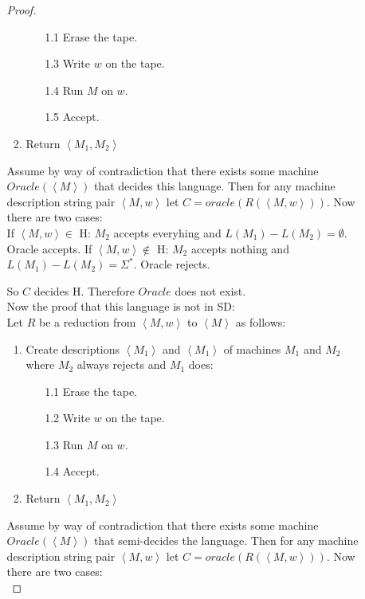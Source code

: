 \documentclass[10pt]{article}
\newcommand{\brackets}[1]{\left< #1 \right>}
\begin{document}
\begin{enumerate}[1)]
\begin{enumerate}[a)]
\begin{proof}[Proof]
\begin{enumerate}[1.]
\begin{enumerate}
\item[1.1]
Erase the tape.

\item[1.3]
Write $w$ on the tape.

\item[1.4]
Run $M$ on $w$.

\item[1.5]
Accept.
\end{enumerate}
\item
Return $\brackets{M_1, M_2}$
\end{enumerate}

Assume by way of contradiction that there exists some machine $Oracle(\brackets{M})$ that decides this language.  Then for any machine description string pair $\brackets{M, w}$ let $C = oracle(R(\brackets{M, w}))$. Now there are two cases:\\

If $\brackets{M, w} \in$ H: $M_2$ accepts everyhing and $L(M_1) - L(M_2) = \emptyset$.  Oracle accepts.
If $\brackets{M, w} \not \in$ H: $M_2$ accepts nothing and $L(M_1) - L(M_2) = \Sigma ^*$.  Oracle rejects.

So $C$ decides H.  Therefore $Oracle$ does not exist.\\

\vspace{1cm}
\noindent
Now the proof that this language is not in SD:\\
Let $R$ be a reduction from $\brackets{M, w}$ to $\brackets{M}$ as follows:
\begin{enumerate}[1.]
\item
Create descriptions $\brackets{M_1}$ and $\brackets{M_1}$ of machines $M_1$ and $M_2$ where $M_2$ always rejects and $M_1$ does:\\
\begin{enumerate}
\item[1.1]
Erase the tape.

\item[1.2]
Write $w$ on the tape.

\item[1.3]
Run $M$ on $w$.

\item[1.4]
Accept.
\end{enumerate}
\item
Return $\brackets{M_1, M_2}$
\end{enumerate}

Assume by way of contradiction that there exists some machine $Oracle(\brackets{M})$ that semi-decides the language.  Then for any machine description string pair $\brackets{M, w}$ let $C = oracle(R(\brackets{M, w}))$. Now there are two cases:\\


\end{proof}
\end{enumerate}
\end{enumerate}
\end{document}
